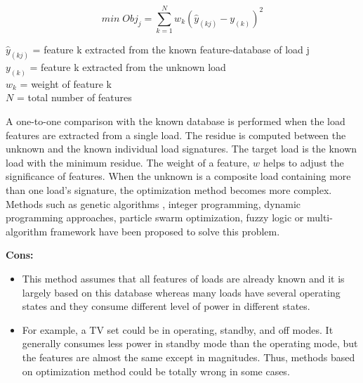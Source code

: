 \documentclass[11pt, a4paper]{article} %
\begin{document}
\[ min \; Obj_j = \sum_{k = 1}^{N} w_k(\hat{y}_{(kj)} - y_{(k)})^2 \]
\begin{flushleft}
$\hat{y}_{(kj)}$ = feature k extracted from the known feature-database of load j \\
$y_{(k)}$ = feature k extracted from the unknown load \\
$w_k$ = weight of feature k \\
$N$ = total number of features \\
\end{flushleft}

A one-to-one comparison with the known database is performed when the load features are extracted from a single load. The residue is computed between the unknown and the known individual load signatures. The target load is the known load with the minimum residue. The weight of a feature, $w$ helps to adjust the significance of features. \newline
When the unknown is a composite load containing more than one load's signature, the optimization method becomes more complex. Methods such as genetic algorithms \cite{Cheng2006ElectricLoadI}, integer programming, dynamic programming approaches, particle swarm optimization, fuzzy logic or multi-algorithm framework have been proposed to solve this problem.

\newline
\textbf{Cons:}
\begin{itemize}
    \item This method assumes that all features of loads are already known and it is largely based on this database whereas many loads have several operating states and they consume different level of power in different states. 
    \item For example, a TV set could be in operating, standby, and off modes. It generally consumes less power in standby mode than the operating mode, but the features are almost the same except in magnitudes. Thus, methods based on optimization method could be totally wrong in some cases.
\end{itemize}

\end{document}

